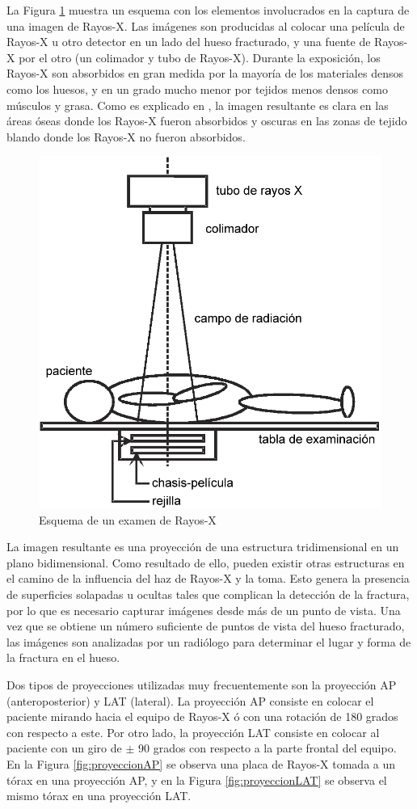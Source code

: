 La Figura \ref{fig:xray} muestra un esquema con los elementos involucrados en la captura de una imagen de Rayos-X. Las im\'agenes son producidas al colocar una pel\'icula de Rayos-X u otro detector en un lado del hueso fracturado, y una fuente de Rayos-X por el otro (un colimador y tubo de Rayos-X). Durante la exposici\'on, los Rayos-X son absorbidos en gran medida por la mayor\'ia de los materiales densos como los huesos, y en un grado mucho menor por tejidos menos densos como m\'usculos y grasa. Como es explicado en \cite{Hollins01}, la imagen resultante es clara en las \'areas \'oseas donde los Rayos-X fueron absorbidos y oscuras en las zonas de tejido blando donde los Rayos-X no fueron absorbidos.
\begin{figure}[htb]
	\centering
		\includegraphics[width=0.40\columnwidth]{images/xray.png}
		\caption{Esquema de un examen de Rayos-X}
	\label{fig:xray}
\end{figure}

La imagen resultante es una proyecci\'on de una estructura tridimensional en un plano bidimensional. Como resultado de ello, pueden existir otras estructuras en el camino de la influencia del haz de Rayos-X y la toma. Esto genera la presencia de superficies solapadas u ocultas tales que complican la detecci\'on de la fractura, por lo que es necesario capturar im\'agenes desde m\'as de un punto de vista. Una vez que se obtiene un n\'umero suficiente de puntos de vista del hueso fracturado, las im\'agenes son analizadas por un radi\'ologo para determinar el lugar y forma de la fractura en el hueso. 

Dos tipos de proyecciones utilizadas muy frecuentemente son la proyecci\'on AP (anteroposterior) y LAT (lateral). La proyecci\'on AP consiste en colocar el paciente mirando hacia el equipo de Rayos-X \'o con una rotaci\'on de 180 grados con respecto a este. Por otro lado, la proyecci\'on LAT consiste en colocar al paciente con un giro de $\pm$ 90 grados con respecto a la parte frontal del equipo. En la Figura \ref{fig:proyeccionAP} se observa una placa de Rayos-X tomada a un t\'orax en una proyecci\'on AP, y en la Figura \ref{fig:proyeccionLAT} se observa el mismo t\'orax en una proyecci\'on LAT.

